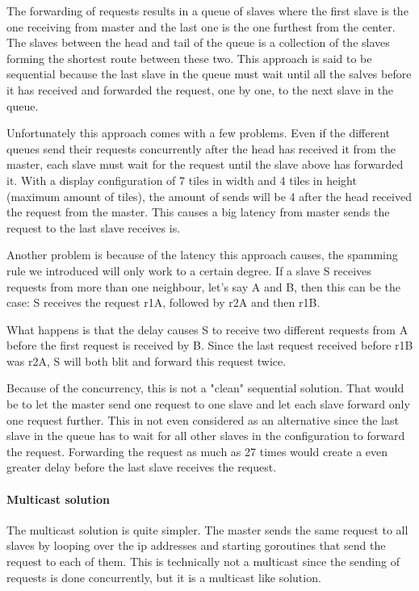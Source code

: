 \documentclass[12pt, a4paper, oneside]{article}
\begin{document}
The forwarding of requests results in a queue of slaves where the first slave is the one receiving from master and the last one is the one furthest from the center. The slaves between the head and tail of the queue is a collection of the slaves forming the shortest route between these two. 
This approach is said to be sequential because the last slave in the queue must wait until all the salves before it has received and forwarded the request, one by one, to the next slave in the queue.

Unfortunately this approach comes with a few problems. Even if the different queues send their requests concurrently after the head has received it from the master, each slave must wait for the request until the slave above has forwarded it. With a display configuration of 7 tiles in width and 4 tiles in height (maximum amount of tiles), the amount of sends will be 4 after the head received the request from the master. This causes a big latency from master sends the request to the last slave receives is. 

Another problem is because of the latency this approach causes, the spamming rule we introduced will only work to a certain degree. If a slave S receives requests from more than one neighbour, let's say A and B, then this can be the case:
S receives the request r1A, followed by r2A and then r1B.

What happens is that the delay causes S to receive two different requests from A before the first request is received by B. Since the last request received before r1B was r2A, S will both blit and forward this request twice. 

Because of the concurrency, this is not a "clean" sequential solution. That would be to let the master send one request to one slave and let each slave forward only one request further. This in not even considered as an alternative since the last slave in the queue has to wait for all other slaves in the configuration to forward the request. Forwarding the request as much as 27 times would create a even greater delay before the last slave receives the request.

\paragraph{Multicast solution}
The multicast solution is quite simpler. The master sends the same request to all slaves by looping over the ip addresses and starting goroutines that send the request to each of them. This is technically not a multicast since the sending of requests is done concurrently, but it is a multicast like solution.
\end{document}
